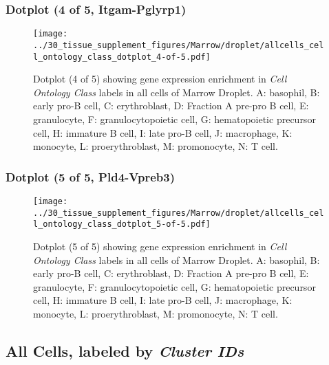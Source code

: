 \clearpage

\subsubsection{Dotplot (4 of 5, Itgam-Pglyrp1)}
\begin{figure}[h]
\centering
\texttt{[image: ../30\_tissue\_supplement\_figures/Marrow/droplet/allcells\_cell\_ontology\_class\_dotplot\_4-of-5.pdf]}

\caption{ Dotplot (4 of 5)  showing gene expression enrichment in \emph{Cell Ontology Class} labels in all cells of Marrow Droplet. A: basophil, B: early pro-B cell, C: erythroblast, D: Fraction A pre-pro B cell, E: granulocyte, F: granulocytopoietic cell, G: hematopoietic precursor cell, H: immature B cell, I: late pro-B cell, J: macrophage, K: monocyte, L: proerythroblast, M: promonocyte, N: T cell.}
\end{figure}


\clearpage

\subsubsection{Dotplot (5 of 5, Pld4-Vpreb3)}
\begin{figure}[h]
\centering
\texttt{[image: ../30\_tissue\_supplement\_figures/Marrow/droplet/allcells\_cell\_ontology\_class\_dotplot\_5-of-5.pdf]}

\caption{ Dotplot (5 of 5)  showing gene expression enrichment in \emph{Cell Ontology Class} labels in all cells of Marrow Droplet. A: basophil, B: early pro-B cell, C: erythroblast, D: Fraction A pre-pro B cell, E: granulocyte, F: granulocytopoietic cell, G: hematopoietic precursor cell, H: immature B cell, I: late pro-B cell, J: macrophage, K: monocyte, L: proerythroblast, M: promonocyte, N: T cell.}
\end{figure}


\clearpage

\subsection{All Cells, labeled by \emph{Cluster IDs}}
